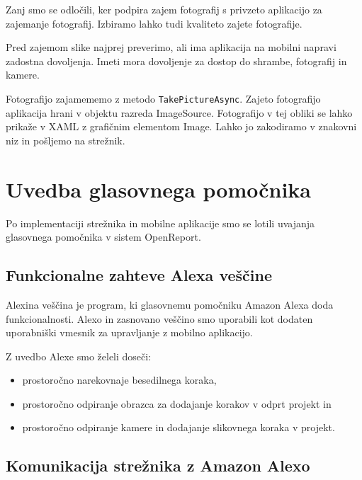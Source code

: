 \documentclass[a4paper, 12pt]{book}
\begin{document}
Zanj smo se odločili, ker podpira zajem fotografij s privzeto aplikacijo za zajemanje fotografij.
Izbiramo lahko tudi kvaliteto zajete fotografije.

Pred zajemom slike najprej preverimo, ali ima aplikacija na mobilni napravi zadostna dovoljenja.
Imeti mora dovoljenje za dostop do shrambe, fotografij in kamere.

Fotografijo zajamememo z metodo \texttt{TakePictureAsync}.
Zajeto fotografijo aplikacija hrani v objektu razreda ImageSource.
Fotografijo v tej obliki se lahko prikaže v XAML z grafičnim elementom Image.
Lahko jo zakodiramo v znakovni niz in pošljemo na strežnik.




\section{Uvedba glasovnega pomočnika}

Po implementaciji strežnika in mobilne aplikacije smo se lotili uvajanja glasovnega pomočnika v sistem OpenReport.

\subsection{Funkcionalne zahteve Alexa veščine}

Alexina veščina je program, ki glasovnemu pomočniku Amazon Alexa doda funkcionalnosti.
Alexo in zasnovano veščino smo uporabili kot dodaten uporabniški vmesnik za upravljanje z mobilno aplikacijo.

\noindent Z uvedbo Alexe smo želeli doseči:
\begin{itemize}
	\item prostoročno narekovnaje besedilnega koraka,
	\item prostoročno odpiranje obrazca za dodajanje korakov v odprt projekt in
	\item prostoročno odpiranje kamere in dodajanje slikovnega koraka v projekt.
\end{itemize}


\subsection{Komunikacija strežnika z Amazon Alexo}
\end{document}
